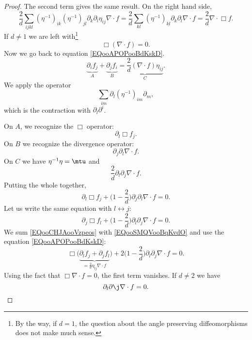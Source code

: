 \begin{proof}
    The second term gives the same result. On the right hand side,
    \begin{equation}
        \frac{ 2 }{ d }\sum_{ijkl}(\eta^{-1})_{ik}(\eta^{-1})_{jl}\partial_k\partial_l\eta_{ij}\nabla\cdot  f=\frac{ 2 }{ d }\sum_{kl}(\eta^{-1})_{kl}\partial_k\partial_l\nabla\cdot f=\frac{ 2 }{ d }\nabla\cdot\Box f.
    \end{equation}
    If \( d\neq 1\) we are left with\footnote{By the way, if \( d=1\), the question about the angle preserving diffeomorphisms does not make much sense.}
    \begin{equation}
        \Box(\nabla\cdot  f)=0.
    \end{equation}
    Now we go back to equation \eqref{EQooAPOPooBdKskD}.
    \begin{equation}
        \underbrace{\partial_i f_j}_{A}+\underbrace{\partial_j f_i}_{B}=\underbrace{\frac{ 2 }{ d }(\nabla\cdot f)\eta_{ij}}_C.
    \end{equation}
    We apply the operator
    \begin{equation}
        \sum_{im}\partial_l(\eta^{-1})_{im}\partial_m,
    \end{equation}
    which is the contraction with \( \partial_l\partial^i\).

    On \( A\), we recognize the \( \Box\) operator:
    \begin{equation}
        \partial_l\Box f_j.
    \end{equation}
    On \( B\) we recognize the divergence operator:
    \begin{equation}
        \partial_j\partial_l\nabla\cdot  f.
    \end{equation}
    On \( C\) we have \( \eta^{-1}\eta=\mtu\) and
    \begin{equation}
        \frac{ 2 }{ d }\partial_l\partial_j\nabla\cdot f.
    \end{equation}
    Putting the whole together,
    \begin{equation}    \label{EQooCHJAooVzpeos}
        \partial_l\Box f_j+\big( 1-\frac{ 2 }{ d } \big)\partial_j\partial_l\nabla\cdot f=0.
    \end{equation}
    Let us write the same equation with \( l\leftrightarrow j\):
    \begin{equation}    \label{EQooSMQVooBqKvdO}
        \partial_j\Box f_l+\big( 1-\frac{ 2 }{ d } \big)\partial_l\partial_j\nabla\cdot f=0.
    \end{equation}
    We sum \eqref{EQooCHJAooVzpeos} with \eqref{EQooSMQVooBqKvdO}  and use the equation \eqref{EQooAPOPooBdKskD}:
    \begin{equation}
        \Box\big( \underbrace{\partial_l f_j+\partial_j f_l}_{=\frac{ 2 }{ d }\eta_{lj}\nabla\cdot f} \big)+2\big( 1-\frac{ 2 }{ d } \big)\partial_l\partial_j\nabla\cdot  f=0.
    \end{equation}
    Using the fact that \( \Box\nabla\cdot f=0\), the first term vanishes. If \( d\neq 2\) we have
    \begin{equation}
        \partial_l\partial\j\nabla\cdot  f=0.
    \end{equation}


\end{proof}
